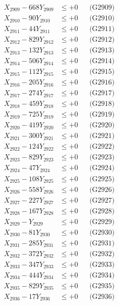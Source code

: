 \documentclass[a4paper,10pt]{article}
\begin{document}
{\begin{align}
X_{2909} - 668Y_{2909} &\leq +0 && \text{(G2909)} \\
X_{2910} - 90Y_{2910} &\leq +0 && \text{(G2910)} \\
\allowbreak
X_{2911} - 44Y_{2911} &\leq +0 && \text{(G2911)} \\
X_{2912} - 829Y_{2912} &\leq +0 && \text{(G2912)} \\
X_{2913} - 132Y_{2913} &\leq +0 && \text{(G2913)} \\
X_{2914} - 506Y_{2914} &\leq +0 && \text{(G2914)} \\
X_{2915} - 112Y_{2915} &\leq +0 && \text{(G2915)} \\
X_{2916} - 205Y_{2916} &\leq +0 && \text{(G2916)} \\
X_{2917} - 274Y_{2917} &\leq +0 && \text{(G2917)} \\
X_{2918} - 459Y_{2918} &\leq +0 && \text{(G2918)} \\
X_{2919} - 725Y_{2919} &\leq +0 && \text{(G2919)} \\
X_{2920} - 419Y_{2920} &\leq +0 && \text{(G2920)} \\
\allowbreak
X_{2921} - 300Y_{2921} &\leq +0 && \text{(G2921)} \\
X_{2922} - 124Y_{2922} &\leq +0 && \text{(G2922)} \\
X_{2923} - 829Y_{2923} &\leq +0 && \text{(G2923)} \\
X_{2924} - 47Y_{2924} &\leq +0 && \text{(G2924)} \\
X_{2925} - 108Y_{2925} &\leq +0 && \text{(G2925)} \\
X_{2926} - 558Y_{2926} &\leq +0 && \text{(G2926)} \\
X_{2927} - 227Y_{2927} &\leq +0 && \text{(G2927)} \\
X_{2928} - 167Y_{2928} &\leq +0 && \text{(G2928)} \\
X_{2929} - Y_{2929} &\leq +0 && \text{(G2929)} \\
X_{2930} - 81Y_{2930} &\leq +0 && \text{(G2930)} \\
\allowbreak
X_{2931} - 285Y_{2931} &\leq +0 && \text{(G2931)} \\
X_{2932} - 372Y_{2932} &\leq +0 && \text{(G2932)} \\
X_{2933} - 347Y_{2933} &\leq +0 && \text{(G2933)} \\
X_{2934} - 444Y_{2934} &\leq +0 && \text{(G2934)} \\
X_{2935} - 829Y_{2935} &\leq +0 && \text{(G2935)} \\
X_{2936} - 17Y_{2936} &\leq +0 && \text{(G2936)} \\

\end{align}}
\end{document}
